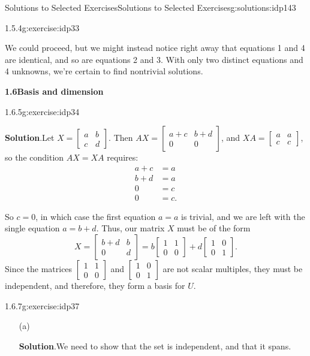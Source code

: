 \documentclass[oneside,10pt,]{book}
\newcommand{\blocktitlefont}{\relax}
\numberwithin{equation}{section}
\newcommand{\bbm}{\begin{bmatrix}}
\newcommand{\ebm}{\end{bmatrix}}
\newcommand{\amp}{&}
\begin{document}
\begin{solutions-chapter}{Solutions to Selected Exercises}{}{Solutions to Selected Exercises}{}{}{g:solutions:idp143}
\begin{inlinesolution}{1.5.4}{}{g:exercise:idp33}
%
\par
We could proceed, but we might instead notice right away that equations 1 and 4 are identical, and so are equations 2 and 3. With only two distinct equations and 4 unknowns, we're certain to find nontrivial solutions.%
\end{inlinesolution}%
\par\medskip
\noindent\textbf{\Large{}1.6\space\textperiodcentered\space{}Basis and dimension}
\begin{inlinesolution}{1.6.5}{}{g:exercise:idp34}%
\par\smallskip%
\noindent\textbf{\blocktitlefont Solution}.\hypertarget{g:solution:idp150-back}{}\quad{}Let \(X=\bbm a\amp b\\c\amp d\ebm\). Then \(AX = \bbm a+c\amp b+d\\0\amp 0\ebm\), and \(XA = \bbm a\amp a\\c\amp c\ebm\), so the condition \(AX=XA\) requires:%
\begin{align*}
a+c \amp = a\\
b+d \amp = a\\
0 \amp = c\\
0 \amp =c\text{.}
\end{align*}
%
\par
So \(c=0\), in which case the first equation \(a=a\) is trivial, and we are left with the single equation \(a=b+d\). Thus, our matrix \(X\) must be of the form%
\begin{equation*}
X = \bbm b+d \amp b\\0\amp d\ebm = b\bbm 1\amp 1\\0\amp 0\ebm + d\bbm 1\amp 0\\0\amp 1\ebm\text{.}
\end{equation*}
Since the matrices \(\bbm 1\amp 1\\0\amp 0\ebm\) and \(\bbm 1\amp 0\\0\amp 1\ebm\) are not scalar multiples, they must be independent, and therefore, they form a basis for \(U\).%
\end{inlinesolution}%
\begin{inlinesolution}{1.6.7}{}{g:exercise:idp37}%
\begin{enumerate}[font=\bfseries,label=(\alph*),ref=\alph*]
\item[(a)]\par\smallskip%
\noindent\textbf{\blocktitlefont Solution}.\hypertarget{g:solution:idp151-back}{}\quad{}We need to show that the set is independent, and that it spans.%
\par

\end{enumerate}
\end{inlinesolution}
\end{solutions-chapter}
\end{document}
